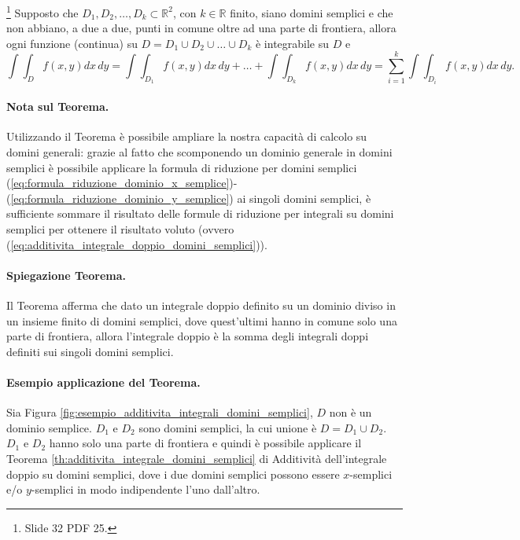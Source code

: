 \begin{theorem}\label{th:additivita_integrale_domini_semplici}\footnote{Slide 32 PDF 25.}
	Supposto che $D_1,D_2,\hdots, D_k\subset\mathbb{R}^2$, con $k\in\mathbb{R}$ finito, siano domini semplici e che non abbiano, a due a due, punti in comune oltre ad una parte di frontiera, allora ogni funzione (continua) su $D=D_1\cup D_2\cup \hdots\cup D_k$ è integrabile su $D$ e
	\begin{equation}\label{eq:additivita_integrale_doppio_domini_semplici}
		\int\int_D f(x,y) dx\, dy = \int\int_{D_1} f(x,y) dx\, dy +\hdots + \int\int_{D_k} f(x,y) dx\, dy = \sum_{i=1}^{k} \int\int_{D_i} f(x,y) dx\, dy.
	\end{equation}
\end{theorem}

\paragraph{Nota sul Teorema.} Utilizzando il Teorema è possibile ampliare la nostra capacità di calcolo su domini generali: grazie al fatto che scomponendo un dominio generale in domini semplici è possibile applicare la formula di riduzione per domini semplici (\ref{eq:formula_riduzione_dominio_x_semplice})-(\ref{eq:formula_riduzione_dominio_y_semplice}) ai singoli domini semplici, è sufficiente sommare il risultato delle formule di riduzione per integrali su domini semplici per ottenere il risultato voluto (ovvero (\ref{eq:additivita_integrale_doppio_domini_semplici})).

\paragraph{Spiegazione Teorema.} Il Teorema afferma che dato un integrale doppio definito su un dominio diviso in un insieme finito di domini semplici, dove quest'ultimi hanno in comune solo una parte di frontiera, allora l'integrale doppio è la somma degli integrali doppi definiti sui singoli domini semplici.

\paragraph{Esempio applicazione del Teorema.} Sia Figura \ref{fig:esempio_additivita_integrali_domini_semplici}, $D$ non è un dominio semplice. $D_1$ e $D_2$ sono domini semplici, la cui unione è $D=D_1\cup D_2$. $D_1$ e $D_2$ hanno solo una parte di frontiera e quindi è possibile applicare il Teorema \ref{th:additivita_integrale_domini_semplici} di Additività dell'integrale doppio su domini semplici, dove i due domini semplici possono essere $x$-semplici e/o $y$-semplici in modo indipendente l'uno dall'altro.

